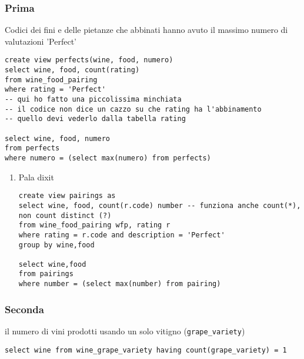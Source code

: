 \documentclass[11pt]{article}
\begin{document}
\subsubsection{Prima}
\label{sec:orgf96fe0e}
Codici dei fini e delle pietanze che abbinati hanno avuto il massimo numero di valutazioni
'Perfect'

\begin{verbatim}
create view perfects(wine, food, numero)
select wine, food, count(rating)
from wine_food_pairing
where rating = 'Perfect'
-- qui ho fatto una piccolissima minchiata
-- il codice non dice un cazzo su che rating ha l'abbinamento
-- quello devi vederlo dalla tabella rating

select wine, food, numero
from perfects
where numero = (select max(numero) from perfects)
\end{verbatim}

\begin{enumerate}
\item Pala dixit
\label{sec:orgd3b0148}
\begin{verbatim}
create view pairings as
select wine, food, count(r.code) number -- funziona anche count(*), non count distinct (?)
from wine_food_pairing wfp, rating r
where rating = r.code and description = 'Perfect'
group by wine,food

select wine,food
from pairings
where number = (select max(number) from pairing)
\end{verbatim}
\end{enumerate}



\subsubsection{Seconda}
\label{sec:org76bf91e}
il numero di vini prodotti usando un solo vitigno (\texttt{grape\_variety})

\begin{verbatim}
select wine from wine_grape_variety having count(grape_variety) = 1
\end{verbatim}
\end{document}
